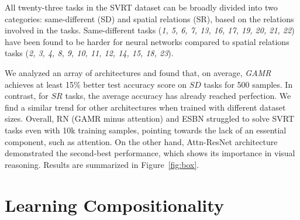 All twenty-three tasks in the SVRT dataset can be broadly divided into two categories: same-different (SD) and spatial relations (SR), based on the relations involved in the tasks. Same-different tasks (\textit{1, 5, 6, 7, 13, 16, 17, 19, 20, 21, 22}) have been found to be harder for neural networks \citep{Ellis2015UnsupervisedLB,kim2018not,stabinger201625,stabinger2021evaluating,Puebla2021.04.06.438551,messina2021recurrent,vaishnav2021understanding} compared to spatial relations tasks (\textit{2, 3, 4, 8, 9, 10, 11, 12, 14, 15, 18, 23}). 

We analyzed an array of architectures and found that, on average, \textit{GAMR} achieves at least 15\% better test accuracy score on $SD$ tasks for 500 samples. In contrast, for $SR$ tasks, the average accuracy has already reached perfection. We find a similar trend for other architectures when trained with different dataset sizes. Overall, RN (GAMR minus attention) and ESBN struggled to solve SVRT tasks even with 10k training samples, pointing towards the lack of an essential component, such as attention. On the other hand, Attn-ResNet architecture demonstrated the second-best performance, which shows its importance in visual reasoning. Results are summarized in Figure~\ref{fig:box}.

\section{Learning Compositionality}
\label{subsec:learningcomp}

